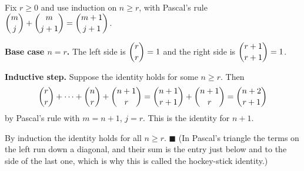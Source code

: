 Fix $r\ge0$ and use induction on $n\ge r$, with Pascal's rule $\dbinom{m}{j}+\dbinom{m}{j+1}=\dbinom{m+1}{j+1}$.

\textbf{Base case $n=r$.} The left side is $\dbinom rr=1$ and the right side is $\dbinom{r+1}{r+1}=1$.

\textbf{Inductive step.} Suppose the identity holds for some $n\ge r$. Then
\[\dbinom rr+\cdots+\dbinom nr+\dbinom{n+1}{r}=\dbinom{n+1}{r+1}+\dbinom{n+1}{r}=\dbinom{n+2}{r+1}\]
by Pascal's rule with $m=n+1$, $j=r$. This is the identity for $n+1$.

By induction the identity holds for all $n\ge r$. $\blacksquare$ (In Pascal's triangle the terms on the left run down a diagonal, and their sum is the entry just below and to the side of the last one, which is why this is called the hockey-stick identity.)
